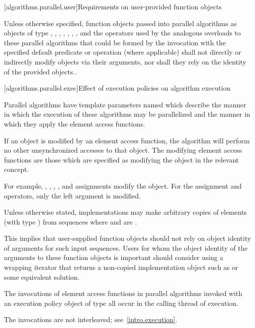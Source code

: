 [algorithms.parallel.user]{Requirements on user-provided function objects}

\pnum
Unless otherwise specified, function objects passed into parallel algorithms as
objects of type , , ,
, , ,
, and the operators used by the analogous overloads to
these parallel algorithms that could be formed by the invocation with the
specified default predicate or operation (where applicable) shall not directly
or indirectly modify objects via their arguments, nor shall they rely on the
identity of the provided objects..

[algorithms.parallel.exec]{Effect of execution policies on algorithm execution}

\pnum
Parallel algorithms have template parameters
named 
which describe the manner in which the execution of these algorithms may be
parallelized and the manner in which they apply the element access functions.

\pnum
If an object is modified by an element access function,
the algorithm will perform no other unsynchronized accesses to that object.
The modifying element access functions are those
which are specified as modifying the object in the relevant concept.
\begin{note}
For example,
, \tcode{++}, \tcode{--}, , and assignments
modify the object.
For the assignment and  operators,
only the left argument is modified.
\end{note}

\pnum
Unless otherwise stated, implementations may make arbitrary copies of elements
(with type ) from sequences where 
and  are .
\begin{note}
This implies that user-supplied function objects should not rely on object
identity of arguments for such input sequences. Users for whom the object
identity of the arguments to these function objects is important should
consider using a wrapping iterator that returns a non-copied implementation
object such as  or some equivalent
solution.
\end{note}

\pnum
The invocations of element access functions in parallel algorithms invoked with
an execution policy object of type  all occur
in the calling thread of execution.
\begin{note}
The invocations are not interleaved; see~\ref{intro.execution}.
\end{note}

